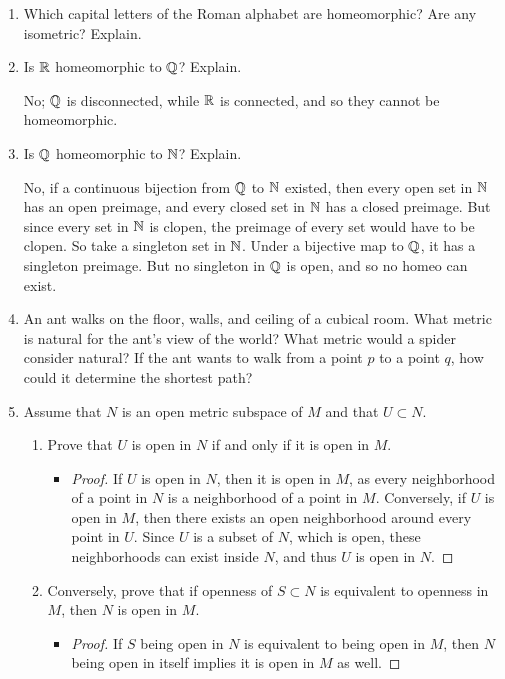 \documentclass[11pt, a4paper, latinreim, shortsets]{notes}
\begin{document}
\begin{enumerate}[label={\bfseries 2.\arabic*}]
	\item Which capital letters of the Roman alphabet are homeomorphic? Are any isometric?
	Explain.

	\item Is $\mathbb{R}$ homeomorphic to $\mathbb{Q}$? Explain.

	No; $\mathbb{Q}$ is disconnected, while $\mathbb{R}$ is connected, and so they cannot be homeomorphic.

	\item Is $\mathbb{Q}$ homeomorphic to $\mathbb{N}$? Explain.

	No, if a continuous bijection from $\mathbb{Q}$ to $\mathbb{N}$ existed, then every open set in $\mathbb{N}$ has an open
	preimage, and every closed set in $\mathbb{N}$ has a closed preimage. But since every set in $\mathbb{N}$ is clopen,
	the preimage of every set would have to be clopen. So take a singleton set in $\mathbb{N}$. Under a bijective
	map to $\mathbb{Q}$, it has a singleton preimage. But no singleton in $\mathbb{Q}$ is open, and so no homeo can exist.

	\item An ant walks on the floor, walls, and ceiling of a cubical room. What metric is
	natural	for the ant's view of the world? What metric would a spider consider natural? If the ant wants
	to walk	from a point $p$ to a point $q$, how could it determine the shortest path?

	\item Assume that $N$ is an open metric subspace of $M$ and that $U \subset N$.
	\begin{enumerate}[label=\alph*)]
		\item Prove that $U$ is open in $N$ if and only if it is open in $M$.
			\begin{itemize}
				\item[] \begin{proof}
						If $U$ is open in $N$, then it is open in $M$, as every neighborhood of a point in $N$
						is a neighborhood of a point in $M$. Conversely, if $U$ is open in $M$, then there exists
						an open neighborhood around every point in $U$. Since $U$ is a subset of $N$, which is open,
						these neighborhoods can exist inside $N$, and thus $U$ is open in $N$.
					\end{proof}
			\end{itemize}
		\item Conversely, prove that if openness of $S \subset N$ is equivalent to openness in $M$, then
			$N$ is open in $M$.
			\begin{itemize}
				\item[] \begin{proof}
						If $S$ being open in $N$ is equivalent to being open in $M$, then $N$ being open in itself
						implies it is open in $M$ as well.
				\end{proof}
			\end{itemize}


\end{enumerate}
\end{enumerate}
\end{document}
